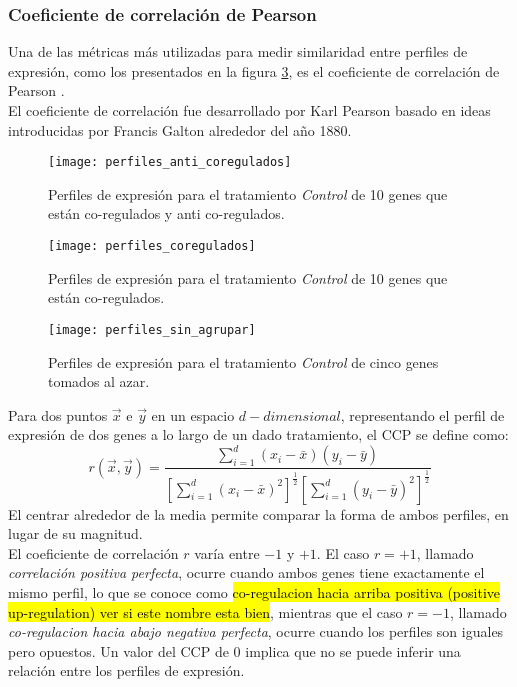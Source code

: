 \subsubsection{Coeficiente de correlación de Pearson}
Una de las métricas más utilizadas para medir similaridad entre perfiles de expresión, como los presentados en la figura \ref{fig:perfiles_sin_agrupar}, es el coeficiente de correlación de Pearson \cite{Babu2004}.\\
El coeficiente de correlación fue desarrollado por Karl Pearson basado en ideas introducidas por Francis Galton alrededor del año 1880.\\
\begin{figure*}[t!]
    \centering
    \begin{subfigure}[t]{0.33\textwidth}
    \centering
    \texttt{[image: perfiles\_anti\_coregulados]}
    \caption{Perfiles de expresión para el tratamiento \textit{Control} de 10 genes que están co-regulados y anti co-regulados.}
    \label{fig:perfiles_anti_coregulados}
    \end{subfigure}
    \begin{subfigure}[t]{0.33\textwidth}
    \centering
    \texttt{[image: perfiles\_coregulados]}
    \caption{Perfiles de expresión para el tratamiento \textit{Control} de 10 genes que están co-regulados.}
    \label{fig:perfiles_coregulados}
    \end{subfigure}
    \begin{subfigure}[t]{0.33\textwidth}
    \centering
    \texttt{[image: perfiles\_sin\_agrupar]}
    \caption{Perfiles de expresión para el tratamiento \textit{Control} de cinco genes tomados al azar.}
    \label{fig:perfiles_sin_agrupar}
    \end{subfigure}    
    \caption{Distintos grupos de perfiles de expresión}
\end{figure*}
Para dos puntos $\vec{x}$ e $\vec{y}$ en un espacio $d-dimensional$, representando el perfil de expresión de dos genes a lo largo de un dado tratamiento, el CCP se define como:
\begin{equation}
	r(\vec{x}, \vec{y}) = \frac{\sum\limits_{i=1}^d(x_i-\bar{x})(y_i-\bar{y})}{[\sum\limits_{i=1}^d(x_i-\bar{x})^2]^\frac{1}{2}[\sum\limits_{i=1}^d(y_i-\bar{y})^2]^\frac{1}{2}}
\end{equation}
El centrar alrededor de la media permite comparar la forma de ambos perfiles, en lugar de su magnitud.\\
El coeficiente de correlación $r$ varía entre $-1$ y $+1$. El caso $r = +1$, llamado \textit{correlación positiva perfecta}, ocurre cuando ambos genes tiene exactamente el mismo perfil, lo que se conoce como \hl{co-regulacion hacia arriba positiva (positive up-regulation) ver si este nombre esta bien}, mientras que el caso $r=-1$, llamado \textit{co-regulacion hacia abajo negativa perfecta}, ocurre cuando los perfiles son iguales pero opuestos. Un valor del CCP de $0$ implica que no se puede inferir una relación entre los perfiles de expresión.\\
